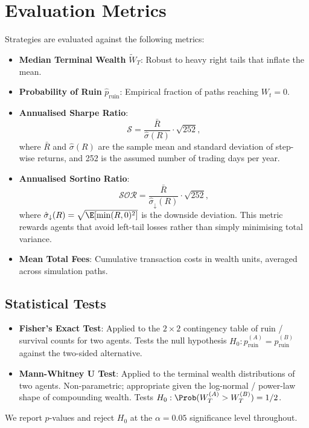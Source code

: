 \section{Evaluation Metrics}

Strategies are evaluated against the following metrics:

\begin{itemize}
    \item \textbf{Median Terminal Wealth} $\tilde{W}_T$: Robust to heavy
    right tails that inflate the mean.

    \item \textbf{Probability of Ruin} $\hat{p}_{\text{ruin}}$:
    Empirical fraction of paths reaching $W_t = 0$.

    \item \textbf{Annualised Sharpe Ratio}:
    \[
        \mathcal{S} = \frac{\bar{R}}{\hat{\sigma}(R)} \cdot \sqrt{252},
    \]
    where $\bar{R}$ and $\hat{\sigma}(R)$ are the sample mean and standard
    deviation of step-wise returns, and 252 is the assumed number of trading
    days per year.

    \item \textbf{Annualised Sortino Ratio}:
    \[
        \mathcal{SOR} = \frac{\bar{R}}{\hat{\sigma}_{\downarrow}(R)} \cdot \sqrt{252},
    \]
    where $\hat{\sigma}_{\downarrow}(R) = \sqrt{\E[\min(R,0)^2]}$ is the
    downside deviation. This metric rewards agents that avoid left-tail
    losses rather than simply minimising total variance.

    \item \textbf{Mean Total Fees}: Cumulative transaction costs in wealth
    units, averaged across simulation paths.
\end{itemize}

\subsection{Statistical Tests}

\begin{itemize}
    \item \textbf{Fisher's Exact Test}: Applied to the $2 \times 2$
    contingency table of ruin / survival counts for two agents. Tests the
    null hypothesis $H_0: p_{\text{ruin}}^{(A)} = p_{\text{ruin}}^{(B)}$
    against the two-sided alternative.

    \item \textbf{Mann-Whitney U Test}: Applied to the terminal wealth
    distributions of two agents. Non-parametric; appropriate given the
    log-normal / power-law shape of compounding wealth. Tests
    $H_0: \Prob(W_T^{(A)} > W_T^{(B)}) = 1/2$.
\end{itemize}

We report $p$-values and reject $H_0$ at the $\alpha = 0.05$ significance
level throughout.
